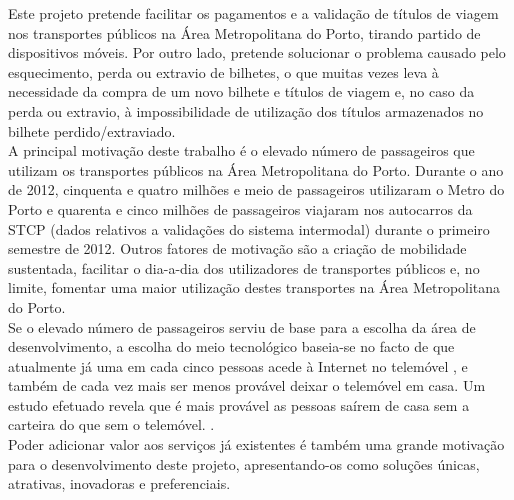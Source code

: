 Este projeto pretende facilitar os pagamentos e a validação de títulos de viagem nos transportes públicos na Área Metropolitana do Porto, tirando partido de dispositivos móveis. Por outro lado, pretende solucionar o problema causado pelo esquecimento, perda ou extravio de bilhetes, o que muitas vezes leva à necessidade da compra de um novo bilhete e títulos de viagem e, no caso da perda ou extravio, à impossibilidade de utilização dos títulos armazenados no bilhete perdido/extraviado.
\\A principal motivação deste trabalho é o elevado número de passageiros que utilizam os transportes públicos na Área Metropolitana do Porto. Durante o ano de 2012, cinquenta e quatro milhões e meio de passageiros utilizaram o Metro do Porto \cite{INE20130528} e quarenta e cinco milhões de passageiros viajaram nos autocarros da STCP (dados relativos a validações do sistema intermodal) durante o primeiro semestre de 2012. \cite{andante} Outros fatores de motivação são a criação de mobilidade sustentada, facilitar o dia-a-dia dos utilizadores de transportes públicos e, no limite, fomentar uma maior utilização destes transportes na Área Metropolitana do Porto.
\\Se o elevado número de passageiros serviu de base para a escolha da área de desenvolvimento, a escolha do meio tecnológico baseia-se no facto de que atualmente já uma em cada cinco pessoas acede à Internet no telemóvel \cite{INE20121106}, e também de cada vez mais ser menos provável deixar o telemóvel em casa. Um estudo efetuado revela que é mais provável as pessoas saírem de casa sem a carteira do que sem o telemóvel. \cite{NFCForum2011}.
\\Poder adicionar valor aos serviços já existentes é também uma grande motivação para o desenvolvimento deste projeto, apresentando-os como soluções únicas, atrativas, inovadoras e preferenciais.

